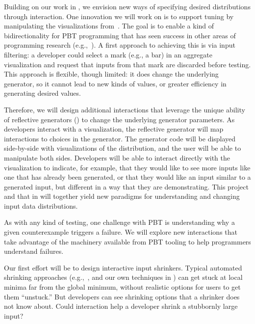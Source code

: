 Building on our work in , we envision new
ways of specifying desired distributions through interaction. One innovation we 
will work on is to support tuning by manipulating the visualizations 
from~. The goal is to enable a kind of 
bidirectionality for PBT programming that has seen success in other areas of 
programming research (e.g.,~\cite{ref:hempel2019sketch, ref:kery2020mage,
  ref:omar2012active, ref:omar2021filling}).
 A first approach to achieving this is via input filtering: a developer could 
select a mark (e.g., a bar) in an aggregate visualization and request that 
inputs from that mark are discarded before testing. This approach is flexible, 
though limited: it does change the underlying generator, so it cannot lead to 
new kinds of values, or greater efficiency in generating desired values.

Therefore, we will design additional interactions that leverage the unique 
ability of reflective generators
() to change the underlying
generator parameters. As developers interact with a visualization,
the reflective generator will map interactions
to choices
in the generator.  The generator code will be displayed
side-by-side with visualizations of the distribution, and the user
will be able to manipulate both sides.
Developers will be able to interact directly with the visualization to
indicate, for example, that they would like to see more inputs like
one that has already
been generated, or that they would like an input similar to a generated input,
but different in a way that they are demonstrating. This project and that in 
 will together yield new paradigms for 
understanding and changing input data distributions.


%
As with any kind of testing, one challenge with PBT is understanding why
a given counterexample triggers a failure. We will explore new interactions that 
take advantage of the machinery available from PBT tooling to help programmers 
understand failures.

Our first effort will be to design interactive input shrinkers. Typical 
automated shrinking approaches 
(e.g.,~\cite{hughes_quickcheck_2007,arts_shrinking_2014}, and our own techniques 
in ) can get stuck at local minima far from the 
global minimum, without realistic options for users to get them ``unstuck.'' But 
developers can see shrinking options that a shrinker does not know about.  Could 
interaction help a developer shrink a stubbornly large input?

